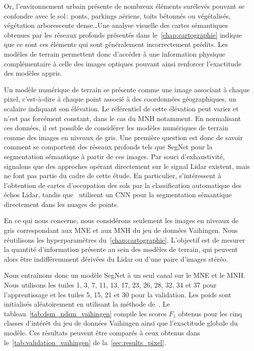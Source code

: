 Or, l'environnement urbain présente de nombreux éléments surélevés pouvant se confondre avec le sol\,: ponts, parkings aériens, toits bétonnés ou végétalisés, végétation arborescente dense\dots Une analyse visuelle des cartes sémantiques obtenues par les réseaux profonds présentés dans le~\cref{chap:cartographie} indique que ce sont ces éléments qui sont généralement incorrectement prédits. Les modèles de terrain permettent donc d'accéder à une information physique complémentaire à celle des images optiques pouvant ainsi renforcer l'exactitude des modèles appris.

Un modèle numérique de terrain se présente comme une image associant à chaque pixel, c'est-à-dire à chaque point associé à des coordonnées géographiques, un scalaire indiquant son élévation. Le référentiel de cette élévation peut varier et n'est pas forcément constant, dans le cas du \gls{MNH} notamment. En normalisant ces données, il est possible de considérer les modèles numériques de terrain comme des images en niveaux de gris. Une première question est donc de savoir comment se comportent des réseaux profonds tels que SegNet pour la segmentation sémantique à partir de ces images. Par souci d'exhaustivité, signalons que des approches opérant directement sur le signal \gls{Lidar} existent, mais ne font pas partie du cadre de cette étude. En particulier, \citet{yan_urban_2015} s'intéressent à l'obtention de cartes d'occupation des sols par la classification automatique des échos \gls{Lidar}, tandis que~\citet{yang_convolutional_2017} utilisent un \gls{CNN} pour la segmentation sémantique directement dans les nuages de points.

En ce qui nous concerne, nous considérons seulement les images en niveaux de gris correspondant aux \gls{MNE} et aux \gls{MNH} du jeu de données  Vaihingen. Nous réutilisons les hyperparamètres du~\cref{chap:cartographie}. L'objectif est de mesurer la quantité d'information présente au sein des modèles de terrain, qui peuvent alors être indifféremment dérivées du \gls{Lidar} ou d'une paire d'images stéréo.

Nous entraînons donc un modèle SegNet à un seul canal sur le \gls{MNE} et le \gls{MNH}. Nous utilisons les tuiles 1, 3, 7, 11, 13, 17, 23, 26, 28, 32, 34 et 37 pour l'apprentissage et les tuiles 5, 15, 21 et 30 pour la validation. Les poids sont initialisés aléatoirement en utilisant la méthode de~\citet{he_delving_2015}. Le tableau~\cref{tab:dsm_ndsm_vaihingen} compile les scores $F_1$ obtenus pour les cinq classes d'intérêt du jeu de données  Vaihingen ainsi que l'exactitude globale du modèle. Ces résultats peuvent être comparés à ceux obtenus dans le~\cref{tab:validation_vaihingen} de la~\cref{sec:results_pixel}.


